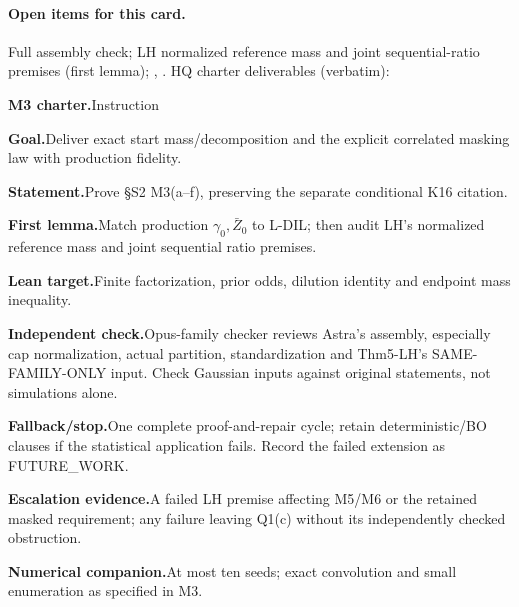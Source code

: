 \paragraph{Open items for this card.} Full assembly check; LH normalized reference mass and joint sequential-ratio premises (first lemma); , . HQ charter deliverables (verbatim):
\par\smallskip\noindent\textbf{M3 charter.}\enspace Instruction
\par\smallskip\noindent\textbf{Goal.}\enspace Deliver exact start mass/decomposition and the explicit correlated masking law with production fidelity.
\par\smallskip\noindent\textbf{Statement.}\enspace Prove §S2 M3(a–f), preserving the separate conditional K16 citation.
\par\smallskip\noindent\textbf{First lemma.}\enspace Match production \(\gamma_0,\bar Z_0\) to L-DIL; then audit LH’s normalized reference mass and joint sequential ratio premises.
\par\smallskip\noindent\textbf{Lean target.}\enspace Finite factorization, prior odds, dilution identity and endpoint mass inequality.
\par\smallskip\noindent\textbf{Independent check.}\enspace Opus-family checker reviews Astra’s assembly, especially cap normalization, actual partition, standardization and Thm5-LH’s SAME-FAMILY-ONLY input. Check Gaussian inputs against original statements, not simulations alone.
\par\smallskip\noindent\textbf{Fallback/stop.}\enspace One complete proof-and-repair cycle; retain deterministic/BO clauses if the statistical application fails. Record the failed extension as FUTURE\_WORK.
\par\smallskip\noindent\textbf{Escalation evidence.}\enspace A failed LH premise affecting M5/M6 or the retained masked requirement; any failure leaving Q1(c) without its independently checked obstruction.
\par\smallskip\noindent\textbf{Numerical companion.}\enspace At most ten seeds; exact convolution and small enumeration as specified in M3.

